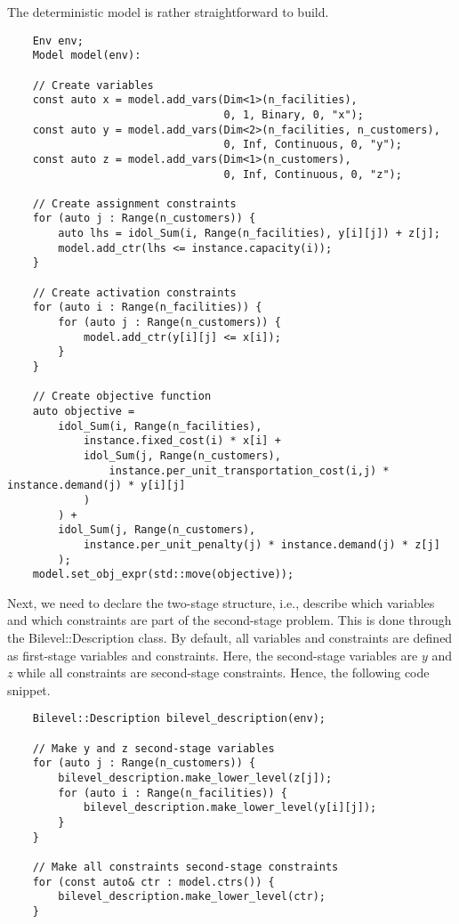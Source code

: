 The deterministic model is rather straightforward to build. 
%
\begin{lstlisting}
    Env env;
    Model model(env):

    // Create variables
    const auto x = model.add_vars(Dim<1>(n_facilities), 
                                  0, 1, Binary, 0, "x");
    const auto y = model.add_vars(Dim<2>(n_facilities, n_customers),
                                  0, Inf, Continuous, 0, "y");
    const auto z = model.add_vars(Dim<1>(n_customers),
                                  0, Inf, Continuous, 0, "z");

    // Create assignment constraints
    for (auto j : Range(n_customers)) {
        auto lhs = idol_Sum(i, Range(n_facilities), y[i][j]) + z[j];
        model.add_ctr(lhs <= instance.capacity(i));
    }

    // Create activation constraints
    for (auto i : Range(n_facilities)) {
        for (auto j : Range(n_customers)) {
            model.add_ctr(y[i][j] <= x[i]);
        }
    }

    // Create objective function
    auto objective = 
        idol_Sum(i, Range(n_facilities), 
            instance.fixed_cost(i) * x[i] +
            idol_Sum(j, Range(n_customers),
                instance.per_unit_transportation_cost(i,j) * instance.demand(j) * y[i][j]
            )
        ) + 
        idol_Sum(j, Range(n_customers), 
            instance.per_unit_penalty(j) * instance.demand(j) * z[j]
        );
    model.set_obj_expr(std::move(objective));
\end{lstlisting}

Next, we need to declare the two-stage structure, i.e., describe which
variables and which constraints are part of the second-stage problem. This is
done through the \textsf{Bilevel::Description} class. By default, all
variables and constraints are defined as first-stage variables and
constraints. Here, the second-stage variables are $y$ and $z$ while all
constraints are second-stage constraints. Hence, the following code snippet.
%
\begin{lstlisting}
    Bilevel::Description bilevel_description(env);

    // Make y and z second-stage variables
    for (auto j : Range(n_customers)) {
        bilevel_description.make_lower_level(z[j]);
        for (auto i : Range(n_facilities)) {
            bilevel_description.make_lower_level(y[i][j]);
        }
    }

    // Make all constraints second-stage constraints
    for (const auto& ctr : model.ctrs()) {
        bilevel_description.make_lower_level(ctr);
    }
\end{lstlisting}

